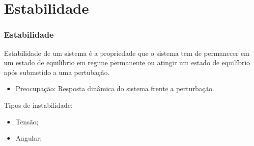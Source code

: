 \section{Estabilidade}
\begin{frame}
\frametitle{Estabilidade}

Estabilidade de um sistema é a propriedade que o sistema tem de permanecer em um estado de equilíbrio em regime permanente ou atingir um estado de equilíbrio após submetido a uma pertubação.


\begin{itemize}
\item Preocupação: Resposta dinâmica do sistema frente a perturbação.
\end{itemize}



Tipos de instabilidade:

\begin{itemize}
\item Tensão;
\item Angular;
\end{itemize}
\end{frame}